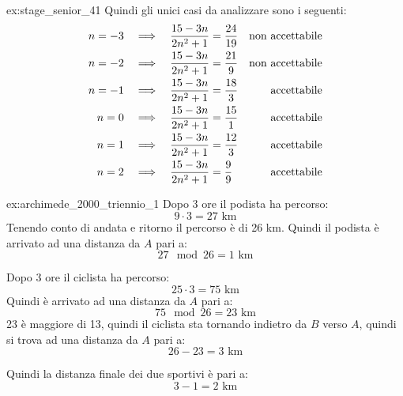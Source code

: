 \begin{soluzione}{ex:stage_senior_41}
    Quindi gli unici casi da analizzare sono i seguenti:
    \begin{align*}
        n = -3 & \quad\Longrightarrow\quad  \dfrac{15 - 3n}{2n^2 + 1} = \dfrac{24}{19} &\text{non accettabile} \\
        n = -2 & \quad\Longrightarrow\quad  \dfrac{15 - 3n}{2n^2 + 1} = \dfrac{21}{9} &\text{non accettabile} \\
        n = -1 & \quad\Longrightarrow\quad  \dfrac{15 - 3n}{2n^2 + 1} = \dfrac{18}{3} &\text{accettabile} \\
        n = 0 & \quad\Longrightarrow\quad  \dfrac{15 - 3n}{2n^2 + 1} = \dfrac{15}{1} &\text{accettabile} \\
        n = 1 & \quad\Longrightarrow\quad  \dfrac{15 - 3n}{2n^2 + 1} = \dfrac{12}{3} &\text{accettabile} \\
        n = 2 & \quad\Longrightarrow\quad  \dfrac{15 - 3n}{2n^2 + 1} = \dfrac{9}{9} &\text{accettabile}
    \end{align*}
\end{soluzione}

\begin{soluzione}{ex:archimede_2000_triennio_1}
    Dopo 3 ore il podista ha percorso:
    \[ 9 \cdot 3 = 27 \text{ km} \]
    Tenendo conto di andata e ritorno il percorso è di 26 km.
    Quindi il podista è arrivato ad una distanza da $A$ pari a:
    \[ 27 \mod 26 = 1 \text{ km} \]

    Dopo 3 ore il ciclista ha percorso:
    \[ 25 \cdot 3 = 75 \text{ km} \]
    Quindi è arrivato ad una distanza da $A$ pari a:
    \[ 75 \mod 26 = 23 \text{ km} \]
    23 è maggiore di 13, quindi il ciclista sta tornando indietro da $B$ verso $A$, quindi si trova ad una distanza da $A$ pari a:
    \[ 26 - 23 = 3 \text{ km} \]

    Quindi la distanza finale dei due sportivi è pari a:
    \[ 3 - 1 = 2 \text{ km} \]
\end{soluzione}

